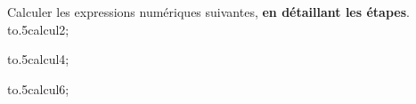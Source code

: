 \documentclass[exercice]{thedocument}%
\begin{document}
%
Calculer les expressions numériques suivantes, {\bfseries en détaillant les étapes}.\vskip10pt
\hbox{\hskip20pt\hbox to.5\linewidth{\newcalc1\<calcul1;\hfill}\hbox{\<calcul2;\hfill}}\par\medskip
\hbox{\hskip20pt\hbox to.5\linewidth{\newcalc3\<calcul3;\hfill}\hbox{\<calcul4;\hfill}}\par\medskip
\hbox{\hskip20pt\hbox to.5\linewidth{\newcalc5\<calcul5;\hfill}\hbox{\<calcul6;\hfill}}\par\medskip
\end{document}
